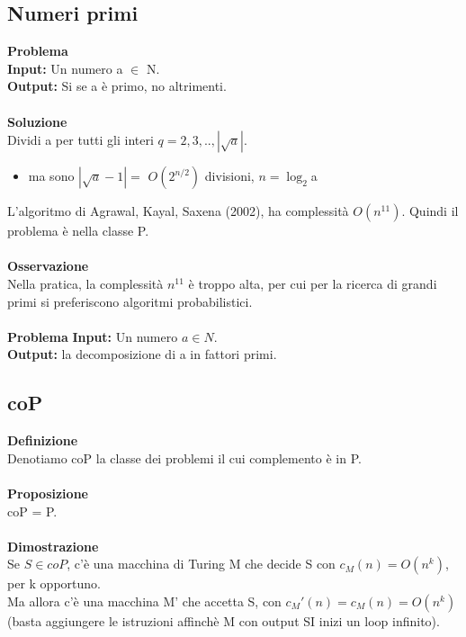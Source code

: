 \subsection{Numeri primi}
\textbf{Problema}\\
\textbf{Input:} Un numero a $\in$ N.\\
\textbf{Output:} Si se a è primo, no altrimenti.\\\\
\textbf{Soluzione}\\
Dividi a per tutti gli interi $q = 2, 3,..,|\sqrt{a}|$.
\begin{itemize}
    \item ma sono $|\sqrt{a} - 1| =$ $O(2^{n/2})$ divisioni, $n = \log_2$a
\end{itemize}
L’algoritmo di Agrawal, Kayal, Saxena (2002), ha complessità $O(n^11)$.
Quindi il problema è nella classe P.\\\\
\textbf{Osservazione}\\
Nella pratica, la complessità $n^11$ è troppo alta, per cui per la ricerca di grandi primi si preferiscono algoritmi probabilistici.\\\\
\textbf{Problema}
\textbf{Input:} Un numero $a \in N$.\\
\textbf{Output:} la decomposizione di a in fattori primi.
\subsection{coP}
\textbf{Definizione}\\
Denotiamo coP la classe dei problemi il cui complemento è in P.\\\\
\textbf{Proposizione}\\
coP = P.\\\\
\textbf{Dimostrazione}\\
Se $S \in coP$, c’è una macchina di Turing M che decide S con $c_M(n) = O(n^k)$, per k opportuno.\\
Ma allora c’è una macchina M' che accetta S, con $c_M'(n) = c_M(n) = O(n^k)$\\


(basta aggiungere le istruzioni affinchè M con output SI inizi un loop infinito).



